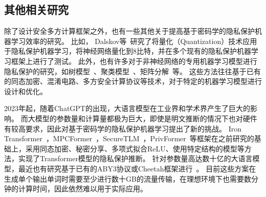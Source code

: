 \subsection{其他相关研究}
除了设计安全多方计算框架之外，也有一些其他关于提高基于密码学的隐私保护机器学习效率的研究。
%
比如，
Dalskov等~\cite{dalskov2020secure_q8}研究了将量化（Quantization）技术应用于隐私保护机器学习，将神经网络量化到8比特，并在多个现有的隐私保护机器学习框架上进行了测试。
%
此外，也有许多对于非神经网络的专用机器学习模型进行隐私保护的研究，如树模型~\cite{wu2020vf_tree,fang2021secure_xgb,lu2023squirrel}、聚类模型~\cite{bunn2007secure_kmeans,wu2020secure_kmeans}、矩阵分解~\cite{nikolaenko2013ppmf,kim2018ppmf}等。
%
这些方法往往基于已有的同态加密、混淆电路、多方安全计算协议等技术，对于特定的机器学习模型进行设计和优化。
%


2023年起，随着ChatGPT的出现，大语言模型在工业界和学术界产生了巨大的影响。
%
而大模型的参数量和计算量都极为巨大，即使是明文推断的情况下也对硬件有较高要求，因此对基于密码学的隐私保护机器学习提出了新的挑战。
%
Iron Transformer~\cite{hao2022iron}，MPCFormer~\cite{li2022mpcformer}，SecureTLM~\cite{chen2024securetlm}，PrivFormer~\cite{akimoto2023privformer}等框架在之前研究的基础上，采用同态加密、秘密分享、多项式拟合ReLU、使用特定结构的模型等方法，实现了Transformer模型的隐私保护推断。
%
针对参数量高达数十亿的大语言模型，最近也有研究基于已有的ABY3协议或Cheetah框架进行~\cite{dong2023puma,lu2023bumblebee,hou2023ciphergpt}。
目前这些方案在生成单个输出单词时需要至少进行数十GB的流量传输，在理想环境下也需要数分钟的计算时间，因此依然难以用于实际应用。




